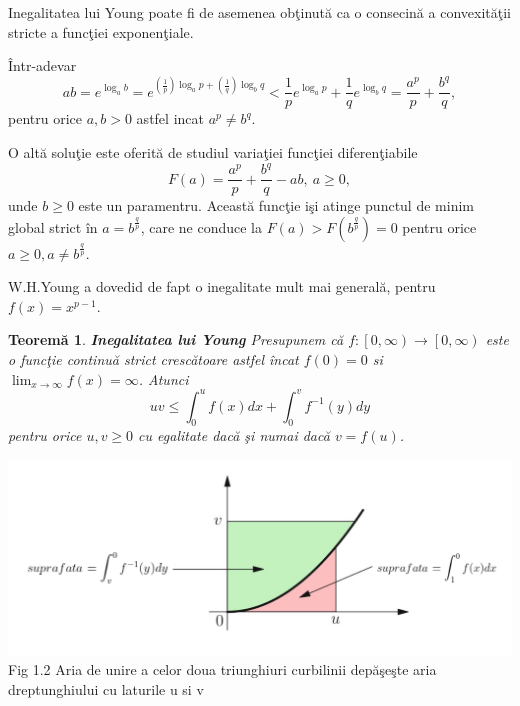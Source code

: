 \documentclass[a4paper,12pt,oneside]{report}
\newtheorem{theorem}{Teorem\u a}
\begin{document}
Inegalitatea lui Young poate fi de asemenea ob\c{t}inut\u{a} ca o consecin\u{a} a convexit\u{a}\c{t}ii stricte a func\c{t}iei exponen\c{t}iale.

\^{I}ntr-adevar
\begin{displaymath}
  ab = e^{\log_{a}b}= e^{\left (\frac{1}{p}  \right )\log_{a}p+ \left ( \frac{1}{q} \right )\log_{b}q}
< \frac{1}{p}e^{\log_{a}p}+\frac{1}{q}e^{\log_{b}q}= \frac{a^{p}}{p}+\frac{b^{q}}{q},
\end{displaymath}
pentru orice \(a,b>0\) astfel incat \(a^{p}\neq b^{q}\).

O alt\u{a} solu\c{t}ie este oferit\u{a} de studiul varia\c{t}iei func\c{t}iei diferen\c{t}iabile
\begin{displaymath}
  F\left ( a \right )= \frac{a^{p}}{p}+\frac{b^{q}}{q} - ab,~ a\geq 0,
\end{displaymath}
unde \(b\geq 0\) este un paramentru. Aceast\u{a} func\c{t}ie i\c{s}i atinge punctul de minim global strict \^{i}n \(a= b^{\frac{q}{p}}\), care ne conduce la \(F\left ( a \right )> F\left ( b^{\frac{q}{p}} \right ) = 0\) pentru orice \(a\geq 0, a\neq b^{\frac{q}{p}}\).

	W.H.Young a dovedid de fapt  o inegalitate mult mai general\u{a}, pentru \(f\left ( x \right )=  x^{p-1}\).

\begin{theorem}
\textbf{Inegalitatea lui Young
}
Presupunem c\u{a} \(f: \left [ 0,\infty  \right ) \rightarrow \left [ 0,\infty  \right )\) este o func\c{t}ie continu\u{a} strict cresc\u{a}toare astfel \^{i}ncat \(f\left ( 0 \right )= 0\) si \(\lim_{x\rightarrow \infty }f\left ( x \right )= \infty\). Atunci
\begin{displaymath}
  uv\leq \int_{0}^{u}f\left ( x \right )dx + \int_{0}^{v}f^{-1}\left ( y \right )dy
\end{displaymath}
pentru orice \(u,v\geq 0\) cu egalitate dac\u{a} \c{s}i numai dac\u{a} \( v = f\left ( u \right )\).
\end{theorem}
\begin{center}
	\includegraphics[width=1.0\textwidth]{fig1.2.png}
	\\ Fig 1.2 Aria  de unire a celor doua triunghiuri curbilinii dep\u{a}\c{s}e\c{s}te aria dreptunghiului cu laturile u si v
\end{center}
\end{document}
